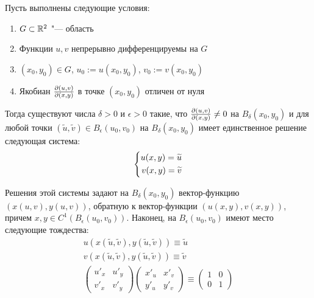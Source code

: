 \begin{theorem}
	Пусть выполнены следующие условия:
	\begin{enumerate}
		\item $G \subset \mathbb{R}^2$ "--- область
		\item Функции $u, v$ непрерывно дифференцируемы на $G$
		\item $(x_0, y_0) \in G$, $u_0 := u(x_0, y_0)$, $v_0 := v(x_0, y_0)$
		\item Якобиан $\frac{\partial (u, v)}{\partial (x, y)}$ в точке $(x_0, y_0)$ отличен от нуля
	\end{enumerate}
	
	Тогда существуют числа $\delta > 0$ и $\epsilon > 0$ такие, что $\frac{\partial (u, v)}{\partial (x, y)} \ne 0$ на $B_\delta(x_0, y_0)$ и для любой точки $(\widetilde u, \widetilde v) \in B_\epsilon(u_0, v_0)$ на $B_\delta(x_0, y_0)$ имеет единственное решение следующая система:
	\[\left\{\begin{aligned}u(x, y) = \widetilde u \\ v(x, y) = \widetilde v\end{aligned}\right.\]
	
	Решения этой системы задают на $B_\delta(x_0, y_0)$ вектор-функцию $\left(x(u, v), y(u, v)\right)$, обратную к вектор-функции $(u(x, y), v(x, y))$, причем $x, y \in C^1(B_\epsilon(u_0, v_0))$. Наконец, на $B_\epsilon(u_0, v_0)$ имеют место следующие тождества:
	\vspace{-8pt}
	\begin{gather*}
		u(x(\widetilde u, \widetilde v), y(\widetilde u, \widetilde v)) \equiv \widetilde u
		\\
		v(x(\widetilde u, \widetilde v), y(\widetilde u, \widetilde v)) \equiv \widetilde v
		\\
		\begin{pmatrix}
			u'_x & u'_y \\
			v'_x & v'_y
		\end{pmatrix}
		\begin{pmatrix}
			x'_u & x'_v \\
			y'_u & y'_v
		\end{pmatrix}
		\equiv
		\begin{pmatrix}
			1 & 0 \\
			0 & 1
		\end{pmatrix}
	\end{gather*}
\end{theorem}

